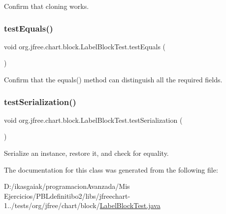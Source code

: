 Confirm that cloning works. \mbox{\label{classorg_1_1jfree_1_1chart_1_1block_1_1_label_block_test_ad83461c81cce3750cdbda32d516bead2}} 
\subsubsection{\texorpdfstring{test\+Equals()}{testEquals()}}
{\footnotesize\ttfamily void org.\+jfree.\+chart.\+block.\+Label\+Block\+Test.\+test\+Equals (\begin{DoxyParamCaption}{ }\end{DoxyParamCaption})}

Confirm that the equals() method can distinguish all the required fields. \mbox{\label{classorg_1_1jfree_1_1chart_1_1block_1_1_label_block_test_aa697d315b382176b5ade4b54cce65e07}} 
\subsubsection{\texorpdfstring{test\+Serialization()}{testSerialization()}}
{\footnotesize\ttfamily void org.\+jfree.\+chart.\+block.\+Label\+Block\+Test.\+test\+Serialization (\begin{DoxyParamCaption}{ }\end{DoxyParamCaption})}

Serialize an instance, restore it, and check for equality. 

The documentation for this class was generated from the following file\+:\begin{DoxyCompactItemize}
\item 
D\+:/ikasgaiak/programacion\+Avanzada/\+Mis Ejercicios/\+P\+B\+Ldefinitibo2/libs/jfreechart-\/1../tests/org/jfree/chart/block/\mbox{\hyperlink{_label_block_test_8java}{Label\+Block\+Test.\+java}}\end{DoxyCompactItemize}

